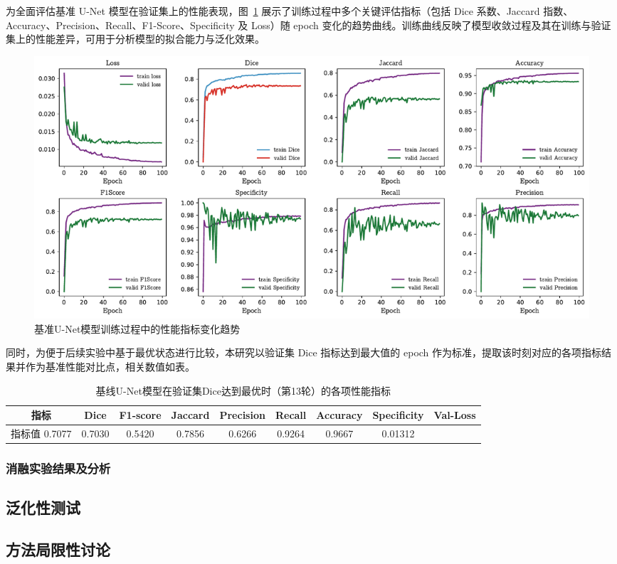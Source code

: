 为全面评估基准 U-Net 模型在验证集上的性能表现，图~\ref{fig:base_unet_metrics} 展示了训练过程中多个关键评估指标（包括 Dice 系数、Jaccard 指数、Accuracy、Precision、Recall、F1-Score、Specificity 及 Loss）随 epoch 变化的趋势曲线。训练曲线反映了模型收敛过程及其在训练与验证集上的性能差异，可用于分析模型的拟合能力与泛化效果。

\begin{figure}[!htbp]
    \centering
    \includegraphics[width=\textwidth]{fig/base_unet_metrics.pdf}
    \caption{基准U-Net模型训练过程中的性能指标变化趋势}
    \label{fig:base_unet_metrics}
\end{figure}

同时，为便于后续实验中基于最优状态进行比较，本研究以验证集 Dice 指标达到最大值的 epoch 作为标准，提取该时刻对应的各项指标结果并作为基准性能对比点，相关数值如表。

\begin{table}[htbp]
    \centering
    \caption{基线U-Net模型在验证集Dice达到最优时（第13轮）的各项性能指标}
    \label{tab:baseline_metrics_horizontal}
    \begin{tabular}{ccccccccc}
        \toprule
        指标 & Dice & F1-score & Jaccard & Precision & Recall & Accuracy & Specificity & Val-Loss \\
        \midrule
        指标值 0.7077 & 0.7030 & 0.5420 & 0.7856 & 0.6266 & 0.9264 & 0.9667 & 0.01312 \\
        \bottomrule
    \end{tabular}
\end{table}

\subsubsection{消融实验结果及分析}


\subsection{泛化性测试}


\subsection{方法局限性讨论}
